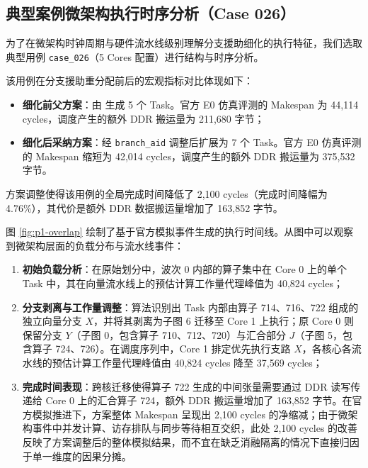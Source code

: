\documentclass[anonymous,withtoc]{gmcm2026}
\providecommand{\tightlist}{\setlength{\itemsep}{0pt}\setlength{\parskip}{0pt}}
\begin{document}
\subsection{典型案例微架构执行时序分析（Case 026）}

为了在微架构时钟周期与硬件流水线级别理解分支援助细化的执行特征，我们选取典型用例 \texttt{case\_026}（5 Cores 配置）进行结构与时序分析。

该用例在分支援助重分配前后的宏观指标对比体现如下：

\begin{itemize}
\tightlist
\item
  \textbf{细化前父方案}：由 \texttt{} 生成 5 个 Task。官方 E0 仿真评测的 Makespan 为 44,114 cycles，调度产生的额外 DDR 搬运量为 211,680 字节；
\item
  \textbf{细化后采纳方案}：经 \texttt{branch\_aid} 调整后扩展为 7 个 Task。官方 E0 仿真评测的 Makespan 缩短为 42,014 cycles，调度产生的额外 DDR 搬运量为 375,532 字节。
\end{itemize}

方案调整使得该用例的全局完成时间降低了 2,100 cycles（完成时间降幅为 4.76\%），其代价是额外 DDR 数据搬运量增加了 163,852 字节。

图 \ref{fig:p1-overlap} 绘制了基于官方模拟事件生成的执行时间线。从图中可以观察到微架构层面的负载分布与流水线事件：

\begin{enumerate}
\def\labelenumi{\arabic{enumi}.}
\tightlist
\item
  \textbf{初始负载分析}：在原始划分中，波次 0 内部的算子集中在 Core 0 上的单个 Task 中，其在向量流水线上的预估计算工作量代理峰值为 40,824 cycles；
\item
  \textbf{分支剥离与工作量调整}：算法识别出 Task 内部由算子 714、716、722 组成的独立向量分支 \(X\)，并将其剥离为子图 6 迁移至 Core 1 上执行；原 Core 0 则保留分支 \(Y\)（子图 0，包含算子 710、712、720）与汇合部分 \(J\)（子图 5，包含算子 724、726）。在调度序列中，Core 1 排定优先执行支路 \(X\)，各核心各流水线的预估计算工作量代理峰值由 40,824 cycles 降至 37,569 cycles；
\item
  \textbf{完成时间表现}：跨核迁移使得算子 722 生成的中间张量需要通过 DDR 读写传递给 Core 0 上的汇合算子 724，额外 DDR 搬运量增加了 163,852 字节。在官方模拟推进下，方案整体 Makespan 呈现出 2,100 cycles 的净缩减；由于微架构事件中并发计算、访存排队与同步等待相互交织，此处 2,100 cycles 的改善反映了方案调整后的整体模拟结果，而不宜在缺乏消融隔离的情况下直接归因于单一维度的因果分摊。
\end{enumerate}
\end{document}
